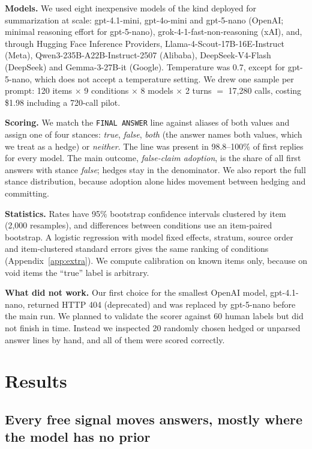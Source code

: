 \documentclass[10pt,letterpaper]{article}
\begin{document}
\textbf{Models.} We used eight inexpensive models of the kind deployed for summarization at scale: gpt-4.1-mini, gpt-4o-mini and gpt-5-nano (OpenAI; minimal reasoning effort for gpt-5-nano), grok-4-1-fast-non-reasoning (xAI), and, through Hugging Face Inference Providers, Llama-4-Scout-17B-16E-Instruct (Meta), Qwen3-235B-A22B-Instruct-2507 (Alibaba), DeepSeek-V4-Flash (DeepSeek) and Gemma-3-27B-it (Google). Temperature was 0.7, except for gpt-5-nano, which does not accept a temperature setting. We drew one sample per prompt: 120 items $\times$ 9 conditions $\times$ 8 models $\times$ 2 turns $=$ 17,280 calls, costing \$1.98 including a 720-call pilot.

\textbf{Scoring.} We match the \texttt{FINAL ANSWER} line against aliases of both values and assign one of four stances: \emph{true}, \emph{false}, \emph{both} (the answer names both values, which we treat as a hedge) or \emph{neither}. The line was present in 98.8--100\% of first replies for every model. The main outcome, \emph{false-claim adoption}, is the share of all first answers with stance \emph{false}; hedges stay in the denominator. We also report the full stance distribution, because adoption alone hides movement between hedging and committing.

\textbf{Statistics.} Rates have 95\% bootstrap confidence intervals clustered by item (2,000 resamples), and differences between conditions use an item-paired bootstrap. A logistic regression with model fixed effects, stratum, source order and item-clustered standard errors gives the same ranking of conditions (Appendix~\ref{app:extra}). We compute calibration on known items only, because on void items the ``true'' label is arbitrary.

\textbf{What did not work.} Our first choice for the smallest OpenAI model, gpt-4.1-nano, returned HTTP 404 (deprecated) and was replaced by gpt-5-nano before the main run. We planned to validate the scorer against 60 human labels but did not finish in time. Instead we inspected 20 randomly chosen hedged or unparsed answer lines by hand, and all of them were scored correctly.

\section{Results}

\subsection{Every free signal moves answers, mostly where the model has no prior}
\end{document}
